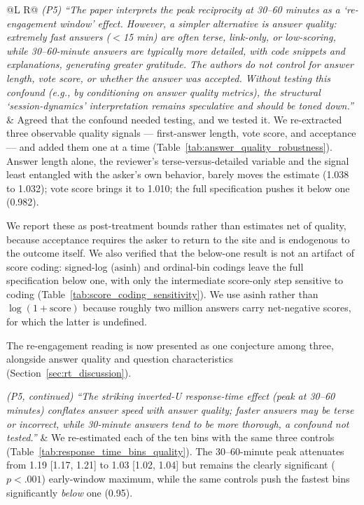 \documentclass[11pt]{article}
\begin{document}
\begin{longtable}{@{}L R@{}}
\textit{(P5) ``The paper interprets the peak reciprocity at 30--60 minutes as a `re-engagement window' effect. However, a simpler alternative is answer quality: extremely fast answers ($<$15 min) are often terse, link-only, or low-scoring, while 30--60-minute answers are typically more detailed, with code snippets and explanations, generating greater gratitude. The authors do not control for answer length, vote score, or whether the answer was accepted. Without testing this confound (e.g., by conditioning on answer quality metrics), the structural `session-dynamics' interpretation remains speculative and should be toned down.''} &
Agreed that the confound needed testing, and we tested it. We re-extracted three observable quality signals --- first-answer length, vote score, and acceptance --- and added them one at a time (Table~\ref{tab:answer_quality_robustness}). Answer length alone, the reviewer's terse-versus-detailed variable and the signal least entangled with the asker's own behavior, barely moves the estimate (1.038 to 1.032); vote score brings it to 1.010; the full specification pushes it below one (0.982).

We report these as post-treatment bounds rather than estimates net of quality, because acceptance requires the asker to return to the site and is endogenous to the outcome itself. We also verified that the below-one result is not an artifact of score coding: signed-log ($\text{asinh}$) and ordinal-bin codings leave the full specification below one, with only the intermediate score-only step sensitive to coding (Table~\ref{tab:score_coding_sensitivity}). We use $\text{asinh}$ rather than $\log(1+\text{score})$ because roughly two million answers carry net-negative scores, for which the latter is undefined.

The re-engagement reading is now presented as one conjecture among three, alongside answer quality and question characteristics (Section~\ref{sec:rt_discussion}). \\
\midrule

\textit{(P5, continued) ``The striking inverted-U response-time effect (peak at 30--60 minutes) conflates answer speed with answer quality; faster answers may be terse or incorrect, while 30-minute answers tend to be more thorough, a confound not tested.''} &
We re-estimated each of the ten bins with the same three controls (Table~\ref{tab:response_time_bins_quality}). The 30--60-minute peak attenuates from 1.19 [1.17, 1.21] to 1.03 [1.02, 1.04] but remains the clearly significant ($p<.001$) early-window maximum, while the same controls push the fastest bins significantly \emph{below} one (0.95).


\end{longtable}
\end{document}
